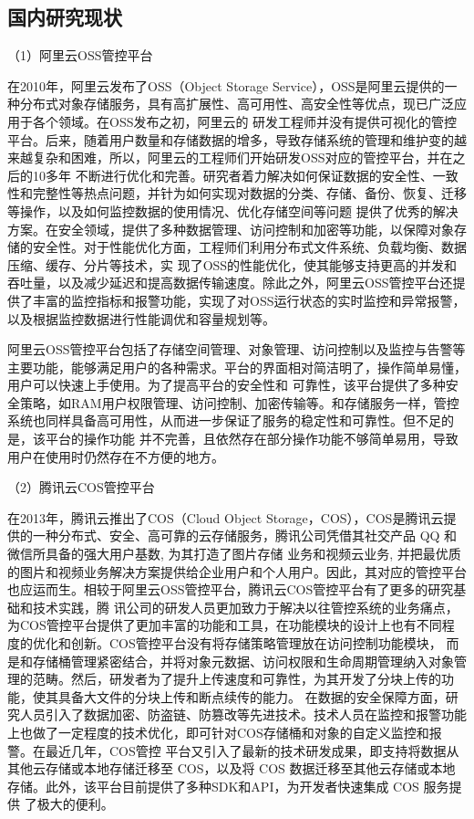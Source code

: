 \subsection{国内研究现状}

（1）阿里云OSS管控平台

在2010年，阿里云发布了OSS（Object Storage Service），OSS是阿里云提供的一种分布式对象存储服务，具有高扩展性、高可用性、高安全性等优点，现已广泛应用于各个领域。在OSS发布之初，阿里云的
研发工程师并没有提供可视化的管控平台。后来，随着用户数量和存储数据的增多，导致存储系统的管理和维护变的越来越复杂和困难，所以，阿里云的工程师们开始研发OSS对应的管控平台，并在之后的10多年
不断进行优化和完善。研究者着力解决如何保证数据的安全性、一致性和完整性等热点问题，并针为如何实现对数据的分类、存储、备份、恢复、迁移等操作，以及如何监控数据的使用情况、优化存储空间等问题
提供了优秀的解决方案。在安全领域，提供了多种数据管理、访问控制和加密等功能，以保障对象存储的安全性。对于性能优化方面，工程师们利用分布式文件系统、负载均衡、数据压缩、缓存、分片等技术，实
现了OSS的性能优化，使其能够支持更高的并发和吞吐量，以及减少延迟和提高数据传输速度。除此之外，阿里云OSS管控平台还提供了丰富的监控指标和报警功能，实现了对OSS运行状态的实时监控和异常报警，
以及根据监控数据进行性能调优和容量规划等。

阿里云OSS管控平台包括了存储空间管理、对象管理、访问控制以及监控与告警等主要功能，能够满足用户的各种需求。平台的界面相对简洁明了，操作简单易懂，用户可以快速上手使用。为了提高平台的安全性和
可靠性，该平台提供了多种安全策略，如RAM用户权限管理、访问控制、加密传输等。和存储服务一样，管控系统也同样具备高可用性，从而进一步保证了服务的稳定性和可靠性。但不足的是，该平台的操作功能
并不完善，且依然存在部分操作功能不够简单易用，导致用户在使用时仍然存在不方便的地方。

（2）腾讯云COS管控平台

在2013年，腾讯云推出了COS（Cloud Object Storage，COS），COS是腾讯云提供的一种分布式、安全、高可靠的云存储服务，腾讯公司凭借其社交产品 QQ 和微信所具备的强大用户基数, 为其打造了图片存储
业务和视频云业务, 并把最优质的图片和视频业务解决方案提供给企业用户和个人用户。因此，其对应的管控平台也应运而生。相较于阿里云OSS管控平台，腾讯云COS管控平台有了更多的研究基础和技术实践，腾
讯公司的研发人员更加致力于解决以往管控系统的业务痛点，为COS管控平台提供了更加丰富的功能和工具，在功能模块的设计上也有不同程度的优化和创新。COS管控平台没有将存储策略管理放在访问控制功能模块，
而是和存储桶管理紧密结合，并将对象元数据、访问权限和生命周期管理纳入对象管理的范畴。然后，研发者为了提升上传速度和可靠性，为其开发了分块上传的功能，使其具备大文件的分块上传和断点续传的能力。
在数据的安全保障方面，研究人员引入了数据加密、防盗链、防篡改等先进技术。技术人员在监控和报警功能上也做了一定程度的技术优化，即可针对COS存储桶和对象的自定义监控和报警。在最近几年，COS管控
平台又引入了最新的技术研发成果，即支持将数据从其他云存储或本地存储迁移至 COS，以及将 COS 数据迁移至其他云存储或本地存储。此外，该平台目前提供了多种SDK和API，为开发者快速集成 COS 服务提供
了极大的便利。

